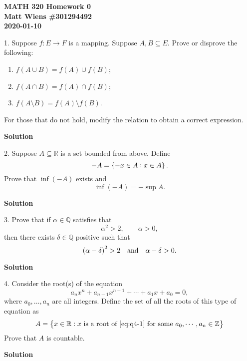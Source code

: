 \documentclass{article}
\newcommand{\Z}{\mathbb{Z}}
\newcommand{\Q}{\mathbb{Q}}
\newcommand{\R}{\mathbb{R}}
\begin{document}
\textbf{MATH 320 Homework 0} \\
\textbf{Matt Wiens \#301294492} \\
\textbf{2020-01-10}

1. Suppose $f: E \to F$ is a mapping. Suppose $A, B \subseteq E$. Prove
   or disprove the following:
%
\begin{enumerate}
    \item $f(A \cup B) = f(A) \cup f(B)$;
    \item $f(A \cap B) = f(A) \cap f(B)$;
    \item $f(A \setminus B) = f(A) \setminus f(B)$.
\end{enumerate}
%
For those that do not hold, modify the relation to obtain a correct
expression.

\textbf{Solution}

\newpage

2. Suppose $A \subseteq \R$ is a set bounded from above. Define
%
\begin{equation*}
   -A = \cbr{-x \in A : x \in A}
   .
\end{equation*}
%
Prove that $\inf(-A)$ exists and
%
\begin{equation*}
    \inf(-A) = -\sup A
    .
\end{equation*}

\textbf{Solution}

\newpage


3. Prove that if $\alpha \in \Q$ satisfies that
%
\begin{equation*}
    \alpha^2 > 2, \qquad \alpha > 0
    ,
\end{equation*}
%
then there exists $\delta \in \Q$ positive such that
%
\begin{equation*}
    \del{\alpha - \delta}^2 > 2
    \quad \text{and} \quad \alpha - \delta > 0
    .
\end{equation*}

\textbf{Solution}

\newpage

4. Consider the root(s) of the equation
%
\begin{equation}
    a_n x^n + a_{n-1} x^{n-1} + \cdots + a_1 x + a_0 = 0
    ,
    \label{eq:q4-1}
\end{equation}
%
where $a_0, \ldots, a_n$ are all integers. Define the set of all the
roots of this type of equation as
%
\begin{equation*}
    A = \cbr{x \in \R : \text{$x$ is a root of \eqref{eq:q4-1} for some $a_0, \cdots, a_n \in \Z$}}
\end{equation*}
%
Prove that $A$ is countable.

\textbf{Solution}
\end{document}
